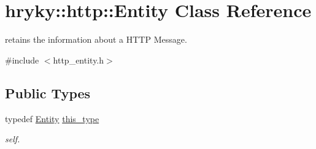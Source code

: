 \hypertarget{classhryky_1_1http_1_1_entity}{\section{hryky\-:\-:http\-:\-:Entity Class Reference}
\label{classhryky_1_1http_1_1_entity}
}


retains the information about a H\-T\-T\-P Message.  




{\ttfamily \#include $<$http\-\_\-entity.\-h$>$}

\subsection*{Public Types}
\begin{DoxyCompactItemize}
\item 
\hypertarget{classhryky_1_1http_1_1_entity_a4afcdfef1cb6784f4dca15a9379e507f}{typedef \hyperlink{classhryky_1_1http_1_1_entity}{Entity} \hyperlink{classhryky_1_1http_1_1_entity_a4afcdfef1cb6784f4dca15a9379e507f}{this\-\_\-type}}\label{classhryky_1_1http_1_1_entity_a4afcdfef1cb6784f4dca15a9379e507f}

\begin{DoxyCompactList}\small\item\em self. \end{DoxyCompactList}\end{DoxyCompactItemize}
